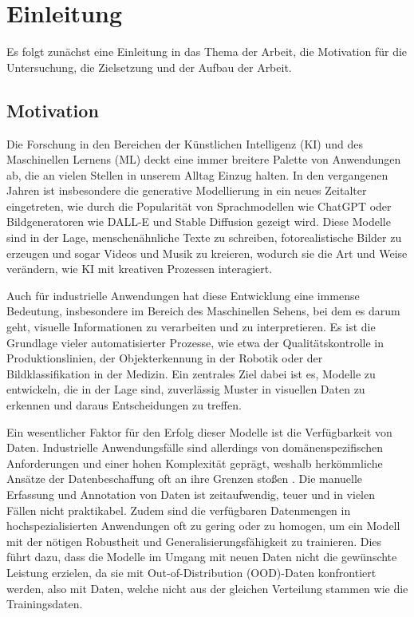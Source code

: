 \chapter{Einleitung} \label{ch:intro}

Es folgt zunächst eine Einleitung in das Thema der Arbeit, die Motivation für die Untersuchung, die Zielsetzung und der Aufbau der Arbeit.

\section{Motivation} \label{sec:motivation}

Die Forschung in den Bereichen der Künstlichen Intelligenz (KI) und des Maschinellen Lernens (ML) deckt eine immer breitere Palette von Anwendungen ab, die an vielen Stellen in unserem Alltag Einzug halten. In den vergangenen Jahren ist insbesondere die generative Modellierung in ein neues Zeitalter eingetreten, wie durch die Popularität von Sprachmodellen wie ChatGPT oder Bildgeneratoren wie DALL-E und Stable Diffusion gezeigt wird. Diese Modelle sind in der Lage, menschenähnliche Texte zu schreiben, fotorealistische Bilder zu erzeugen und sogar Videos und Musik zu kreieren, wodurch sie die Art und Weise verändern, wie KI mit kreativen Prozessen interagiert.

Auch für industrielle Anwendungen hat diese Entwicklung eine immense Bedeutung, insbesondere im Bereich des Maschinellen Sehens, bei dem es darum geht, visuelle Informationen zu verarbeiten und zu interpretieren. Es ist die Grundlage vieler automatisierter Prozesse, wie etwa der Qualitätskontrolle in Produktionslinien, der Objekterkennung in der Robotik oder der Bildklassifikation in der Medizin. Ein zentrales Ziel dabei ist es, Modelle zu entwickeln, die in der Lage sind, zuverlässig Muster in visuellen Daten zu erkennen und daraus Entscheidungen zu treffen.

Ein wesentlicher Faktor für den Erfolg dieser Modelle ist die Verfügbarkeit von Daten. Industrielle Anwendungsfälle sind allerdings von domänenspezifischen Anforderungen und einer hohen Komplexität geprägt, weshalb herkömmliche Ansätze der Datenbeschaffung oft an ihre Grenzen stoßen \parencite{Kraljevski2023smalldata,Lu2024syntheticdatareview}. Die manuelle Erfassung und Annotation von Daten ist zeitaufwendig, teuer und in vielen Fällen nicht praktikabel. Zudem sind die verfügbaren Datenmengen in hochspezialisierten Anwendungen oft zu gering oder zu homogen, um ein Modell mit der nötigen Robustheit und Generalisierungsfähigkeit zu trainieren. Dies führt dazu, dass die Modelle im Umgang mit neuen Daten nicht die gewünschte Leistung erzielen, da sie mit Out-of-Distribution (OOD)-Daten konfrontiert werden, also mit Daten, welche nicht aus der gleichen Verteilung stammen wie die Trainingsdaten.

